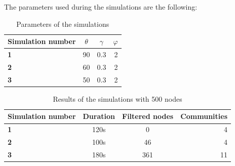 \documentclass[12pt]{article}
\begin{document}
The parameters used during the simulations are the following:
\begin{table}[tbhp]
    \centering
    \begin{tabu}{|l|c|c|r|}
        \hline
        Simulation number & $\theta$ & $\gamma$  & $\varphi$  \\ \hline
        \textbf{1}    & 90  & 0.3  & 2   \\ \hline
        \textbf{2}    & 60  & 0.3  & 2   \\ \hline
        \textbf{3}    & 50  & 0.3  & 2   \\ \hline


  \end{tabu}                                                                                        \label{tab:parameters2}
    \caption[A Table]{Parameters of the simulations}
\end{table}
\newpage
\begin{table}[H]
    \centering
    \begin{tabu}{|l|c|c|r|}
        \hline
        Simulation number & Duration & Filtered nodes  & Communities  \\ \hline
        \textbf{1}    & 120s  & 0  & 4   \\ \hline
        \textbf{2}    & 100s  & 46  & 4   \\ \hline
        \textbf{3}    & 180s  & 361  & 11    \\ \hline  \end{tabu}
    \caption{Results of the simulations with 500 nodes}
    \label{tab:result2}
\end{table}
\end{document}
